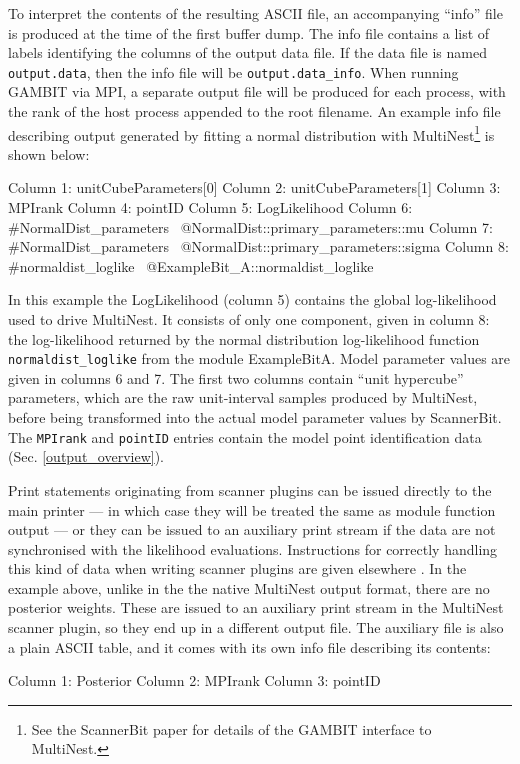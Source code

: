 \documentclass[pdftex,twocolumn,epjc3_preprint,runningheads]{svjour3}
\renewcommand{\_}{\discretionary{\underscore}{}{\underscore}}
\newcommand\cpp[1]{{\lstinline!#1!}}  %
\newcommand\term[1]{{\lstset{style=terminal}\lstinline!#1!\lstset{style=cpp}}}
\newcommand{\gambit}{\textsf{GAMBIT}\xspace}
\newcommand{\scannerbit}{\textsf{ScannerBit}\xspace}
\newcommand{\examplebita}{\textsf{ExampleBit\_A}\xspace}
\newcommand{\GB}{\gambit}
\newcommand{\mpi}{\textsf{MPI}\xspace}
\newcommand\MultiNest{\textsf{MultiNest}\xspace}
\begin{document}
To interpret the contents of the resulting ASCII file, an accompanying ``info'' file is produced at the time of the first buffer dump.  The info file contains a list of labels identifying the columns of the output data file. If the data file is named \term{output.data}, then the info file will be \term{output.data_info}. When running \GB via \mpi, a separate output file will be produced for each process, with the rank of the host process appended to the root filename. An example info file describing output generated by fitting a normal distribution with \MultiNest\cite{MultiNest}\footnote{See the \scannerbit paper \cite{ScannerBit} for details of the \GB interface to \MultiNest.} is shown below:
%
\begin{lsttext}
Column 1: unitCubeParameters[0]
Column 2: unitCubeParameters[1]
Column 3: MPIrank
Column 4: pointID
Column 5: LogLikelihood
Column 6: #NormalDist_parameters \
  @NormalDist::primary_parameters::mu
Column 7: #NormalDist_parameters \
  @NormalDist::primary_parameters::sigma
Column 8: #normaldist_loglike \
  @ExampleBit_A::normaldist_loglike
\end{lsttext}
%
In this example the LogLikelihood (column 5) contains the global log-likelihood used to drive \MultiNest.  It consists of only one component, given in column 8: the log-likelihood returned by the normal distribution log-likelihood function \cpp{normaldist_loglike} from the module \examplebita. Model parameter values are given in columns 6 and 7. The first two columns contain ``unit hypercube'' parameters, which are the raw unit-interval samples produced by \MultiNest, before being transformed into the actual model parameter values by \scannerbit \cite{ScannerBit}. The \term{MPIrank} and \term{pointID} entries contain the model point identification data (Sec. \ref{output_overview}).

Print statements originating from scanner plugins can be issued directly to the main printer --- in which case they will be treated the same as module function output --- or they can be issued to an auxiliary print stream if the data are not synchronised with the likelihood evaluations. Instructions for correctly handling this kind of data when writing scanner plugins are given elsewhere \cite{ScannerBit}.  In the example above, unlike in the the native \MultiNest output format, there are no posterior weights. These are issued to an auxiliary print stream in the \MultiNest scanner plugin, so they end up in a different output file. The auxiliary file is also a plain ASCII table, and it comes with its own info file describing its contents:
%
\begin{lsttext}
Column 1: Posterior
Column 2: MPIrank
Column 3: pointID
\end{lsttext}
\end{document}
